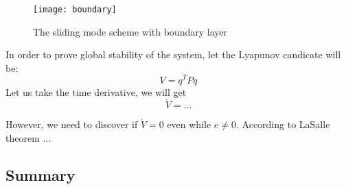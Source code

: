 \begin{figure}[H]
    \centering\texttt{[image: boundary]}
    \caption{The sliding mode scheme with boundary layer}
    \label{image:boundary}
\end{figure}

In order to prove global stability of the system, let the Lyapunov candicate will be:
$$
V = q^TPq
$$
Let us take the time derivative, we will get
$$
\dot V = ...
$$

However, we need to discover if $\dot V = 0$ even while $e \neq 0$. 
According to LaSalle theorem ...

\subsection{Summary}




